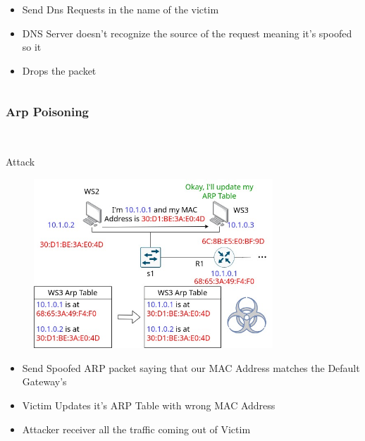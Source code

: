 \documentclass{beamer}
\begin{document}
\begin{frame}
\begin{columns}
\begin{column}{0.5\textwidth}
\begin{figure}
        \end{figure}
            \begin{itemize}[label={}]
                \item \footnotesize Send Dns Requests in the name of the victim
                \item \footnotesize DNS Server doesn't recognize the source of the request meaning it's spoofed so it
                \item \footnotesize Drops the packet
            \end{itemize}
    \end{column}
\end{columns}
\end{frame}

\begin{frame}
\frametitle{Arp Poisoning}
\begin{columns}
    \begin{column}{0.5\textwidth}
        \\
        \Large Attack
        \begin{figure}
            \centering
            \includegraphics[width=0.8\textwidth]{arp_attack.jpg}\\
        \end{figure}
            \begin{itemize}[label={}]
                \item \footnotesize Send Spoofed ARP packet saying that our MAC Address matches the Default Gateway's
                \item \footnotesize Victim Updates it's ARP Table with wrong MAC Address
               \item \footnotesize Attacker receiver all the traffic coming out of Victim
            \end{itemize}

\end{column}
\end{columns}
\end{frame}
\end{document}
